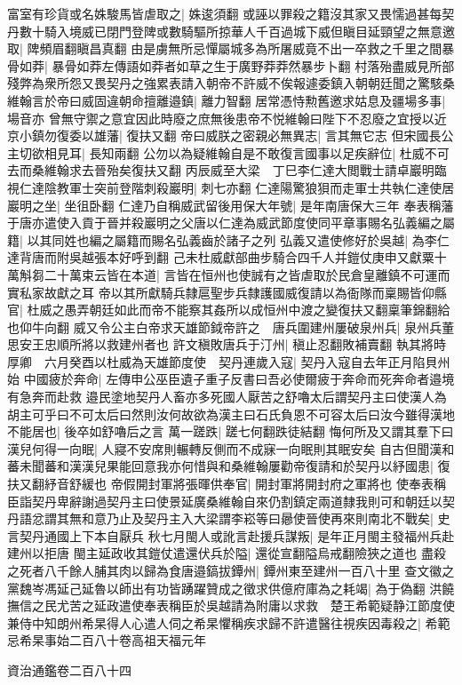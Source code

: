 富室有珍貨或名姝駿馬皆虐取之|{
	姝逡須翻}
或誣以罪殺之籍沒其家又畏懦過甚每契丹數十騎入境威已閉門登陴或數騎驅所掠華人千百過城下威但瞋目延頸望之無意邀取|{
	陴頻眉翻瞋昌真翻}
由是虜無所忌憚屬城多為所屠威竟不出一卒救之千里之間暴骨如莽|{
	暴骨如莽左傳語如莽者如草之生于廣野莽莽然暴步卜翻}
村落殆盡威見所部殘弊為衆所怨又畏契丹之強累表請入朝帝不許威不俟報遽委鎮入朝朝廷聞之驚駭桑維翰言於帝曰威固違朝命擅離邉鎮|{
	離力智翻}
居常憑恃勲舊邀求姑息及疆場多事|{
	場音亦}
曾無守禦之意宜因此時廢之庶無後患帝不悦維翰曰陛下不忍廢之宜授以近京小鎮勿復委以雄藩|{
	復扶又翻}
帝曰威朕之密親必無異志|{
	言其無它志}
但宋國長公主切欲相見耳|{
	長知兩翻}
公勿以為疑維翰自是不敢復言國事以足疾辭位|{
	杜威不可去而桑維翰求去晉殆矣復扶又翻}
丙辰威至大梁　丁巳李仁達大閲戰士請卓巖明臨視仁達陰教軍士突前登階刺殺巖明|{
	刺七亦翻}
仁達陽驚狼狽而走軍士共執仁達使居巖明之坐|{
	坐徂卧翻}
仁達乃自稱威武留後用保大年號|{
	是年南唐保大三年}
奉表稱藩于唐亦遣使入貢于晉并殺巖明之父唐以仁達為威武節度使同平章事賜名弘義編之屬籍|{
	以其同姓也編之屬籍而賜名弘義齒於諸子之列}
弘義又遣使修好於吳越|{
	為李仁達背唐而附吳越張本好呼到翻}
己未杜威獻部曲步騎合四千人并鎧仗庚申又獻粟十萬斛芻二十萬束云皆在本道|{
	言皆在恒州也使誠有之皆虐取於民倉皇離鎮不可運而實私家故獻之耳}
帝以其所獻騎兵隸扈聖步兵隸護國威復請以為衙隊而稟賜皆仰縣官|{
	杜威之愚弄朝廷如此而帝不能察其姦所以成恒州中渡之變復扶又翻稟筆錦翻給也仰牛向翻}
威又令公主白帝求天雄節鉞帝許之　唐兵圍建州屢破泉州兵|{
	泉州兵董思安王忠順所將以救建州者也}
許文稹敗唐兵于汀州|{
	稹止忍翻敗補賣翻}
執其將時厚卿　六月癸酉以杜威為天雄節度使　契丹連歲入寇|{
	契丹入寇自去年正月陷貝州始}
中國疲於奔命|{
	左傳申公巫臣遺子重子反書曰吾必使爾疲于奔命而死奔命者邉境有急奔而赴救}
邉民塗地契丹人畜亦多死國人厭苦之舒嚕太后謂契丹主曰使漢人為胡主可乎曰不可太后曰然則汝何故欲為漢主曰石氏負恩不可容太后曰汝今雖得漢地不能居也|{
	後卒如舒嚕后之言}
萬一蹉跌|{
	蹉七何翻跌徒結翻}
悔何所及又謂其羣下曰漢兒何得一向眠|{
	人寢不安席則輾轉反側而不成寐一向眠則其眠安矣}
自古但聞漢和蕃未聞蕃和漢漢兒果能回意我亦何惜與和桑維翰屢勸帝復請和於契丹以紓國患|{
	復扶又翻紓音舒緩也}
帝假開封軍將張暉供奉官|{
	開封軍將開封府之軍將也}
使奉表稱臣詣契丹卑辭謝過契丹主曰使景延廣桑維翰自來仍割鎮定兩道隸我則可和朝廷以契丹語忿謂其無和意乃止及契丹主入大梁謂李崧等曰曏使晉使再來則南北不戰矣|{
	史言契丹通國上下本自厭兵}
秋七月閩人或訛言赴援兵謀叛|{
	是年正月閩主發福州兵赴建州以拒唐}
閩主延政收其鎧仗遣還伏兵於隘|{
	還從宣翻隘烏戒翻險狹之道也}
盡殺之死者八千餘人脯其肉以歸為食唐邉鎬拔鐔州|{
	鐔州東至建州一百八十里}
查文徽之黨魏岑馮延己延魯以師出有功皆踴躍贊成之徵求供億府庫為之耗竭|{
	為于偽翻}
洪饒撫信之民尤苦之延政遣使奉表稱臣於吳越請為附庸以求救　楚王希範疑静江節度使兼侍中知朗州希杲得人心遣人伺之希杲懼稱疾求歸不許遣醫往視疾因毒殺之|{
	希範忌希杲事始二百八十卷高祖天福元年}


資治通鑑卷二百八十四
